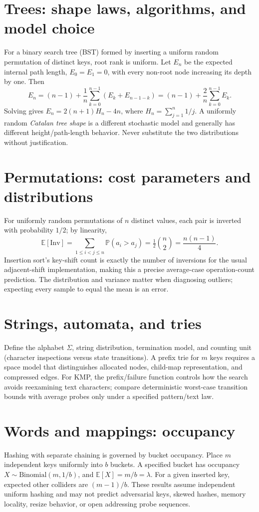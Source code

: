 \documentclass[11pt]{article}
\providecommand{\Expect}{\mathbb{E}}
\providecommand{\Prob}{\mathbb{P}}
\begin{document}
\section{Trees: shape laws, algorithms, and model choice}
For a binary search tree (BST) formed by inserting a uniform random permutation of distinct keys, root rank is uniform. Let $E_n$ be the expected internal path length, $E_0=E_1=0$, with every non-root node increasing its depth by one. Then
\[
E_n=(n-1)+\frac{1}{n}\sum_{k=0}^{n-1}(E_k+E_{n-1-k})
=(n-1)+\frac{2}{n}\sum_{k=0}^{n-1}E_k.
\]
Solving gives $E_n=2(n+1)H_n-4n$, where $H_n=\sum_{j=1}^{n}1/j$. A uniformly random \emph{Catalan tree shape} is a different stochastic model and generally has different height/path-length behavior. Never substitute the two distributions without justification.

\section{Permutations: cost parameters and distributions}
For uniformly random permutations of $n$ distinct values, each pair is inverted with probability $1/2$; by linearity,
\[
\Expect[\mathrm{Inv}]=\sum_{1\le i<j\le n}\Prob(a_i>a_j)
=\tfrac12\binom{n}{2}=\frac{n(n-1)}4.
\]
Insertion sort's key-shift count is exactly the number of inversions for the usual adjacent-shift implementation, making this a precise average-case operation-count prediction. The distribution and variance matter when diagnosing outliers; expecting every sample to equal the mean is an error.

\section{Strings, automata, and tries}
Define the alphabet $\Sigma$, string distribution, termination model, and counting unit (character inspections versus state transitions). A prefix trie for $m$ keys requires a space model that distinguishes allocated nodes, child-map representation, and compressed edges. For KMP, the prefix/failure function controls how the search avoids reexamining text characters; compare deterministic worst-case transition bounds with average probes only under a specified pattern/text law.

\section{Words and mappings: occupancy}
Hashing with separate chaining is governed by bucket occupancy. Place $m$ independent keys uniformly into $b$ buckets. A specified bucket has occupancy $X\sim\mathrm{Binomial}(m,1/b)$, and $\Expect[X]=m/b=\lambda$. For a given inserted key, expected other colliders are $(m-1)/b$. These results assume independent uniform hashing and may not predict adversarial keys, skewed hashes, memory locality, resize behavior, or open addressing probe sequences.
\end{document}
